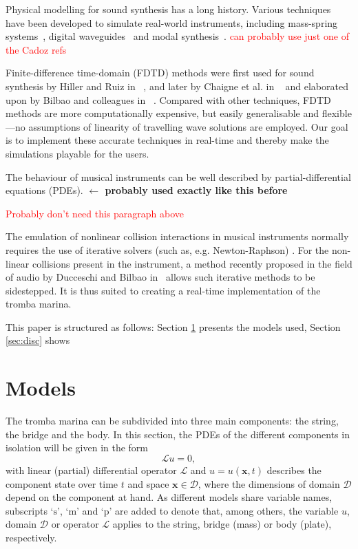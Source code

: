 \documentclass[dvipsnames, pdftex]{article}
\def\SBcomment[#1]{\textcolor{Red}{#1}}
\begin{document}
Physical modelling for sound synthesis has a long history. Various techniques have been developed to simulate real-world instruments, including mass-spring systems~\cite{cadoz79, cadoz83, cadoz1993cordis}, digital waveguides~\cite{smith1992physical} and modal synthesis~\cite{morrison1993mosaic}. 
\SBcomment[can probably use just one of the Cadoz refs]

Finite-difference time-domain (FDTD) methods were first used for sound synthesis by Hiller and Ruiz in ~\cite{Ruiz1969, Hiller1971, Hiller2}, and later by Chaigne et al. in ~\cite{Chaigne92, Chaigne} and elaborated upon by Bilbao and colleagues in ~\cite{bilbao2009numerical, Bilbao2018:Tutorial}. Compared with other techniques, FDTD methods are more computationally expensive, but easily generalisable and flexible---no assumptions of linearity of travelling wave solutions are employed. Our goal is to implement these accurate techniques in real-time and thereby make the simulations playable for the users. 

The behaviour of musical instruments can be well described by partial-differential equations (PDEs). \textbf{$\leftarrow$ probably used exactly like this before}

\SBcomment[Probably don't need this paragraph above]

The emulation of nonlinear collision interactions in musical instruments normally requires the use of iterative solvers (such as, e.g. Newton-Raphson) \cite{Bilbao15}. For the non-linear collisions present in the instrument, a method recently proposed in the field of audio by Ducceschi and Bilbao in~\cite{Ducceschi2019} allows such iterative methods to be sidestepped. It is thus suited  to creating a real-time implementation of the tromba marina.

This paper is structured as follows: Section \ref{sec:models} presents the models used, Section \ref{sec:disc} shows 

\section{Models}\label{sec:models}
The tromba marina can be subdivided into three main components: the string, the bridge and the body. In this section, the PDEs of the different components in isolation will be given in the form
\begin{equation}\label{eq:PDEform}
    \mathcal{L}u = 0,
\end{equation}
with linear (partial) differential operator $\mathcal{L}$ and $u = u(\boldsymbol{x},t)$ describes the component state over time $t$ and space $\boldsymbol{x}\in\mathcal{D}$, where the dimensions of domain $\mathcal{D}$ depend on the component at hand. As different models share variable names, subscripts `$\text{s}$', `$\text{m}$' and `$\text{p}$' are added to denote that, among others, the variable $u$, domain ${\mathcal D}$ or operator ${\mathcal L}$ applies to the string, bridge (mass) or body (plate), respectively.
\end{document}
